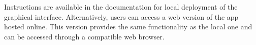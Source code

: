 \documentclass[../../dissertation.tex]{subfiles}
\begin{document}
Instructions are available in the documentation for local deployment of the graphical interface.
Alternatively, users can access a web version of the app hosted online. This
version provides the same functionality as the local one and can be
accessed through a compatible web browser.\par
\begin{figure}[!h]
  \begin{minipage}{.5\linewidth}
    \centering
  \end{minipage}%
  \begin{minipage}{.5\linewidth}
    \centering

\end{minipage}
\end{figure}
\end{document}
